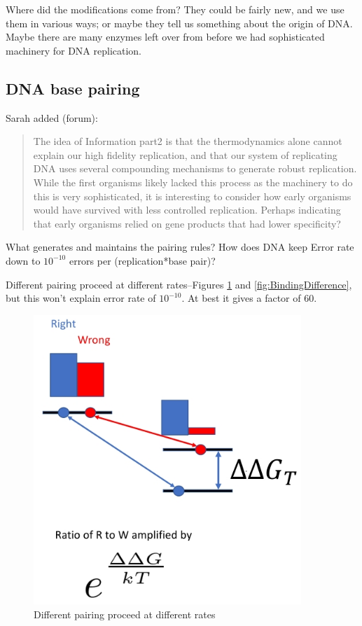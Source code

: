 \documentclass[]{article}
\begin{document}
Where did the modifications come from? They could be fairly new, and we use them in various ways; or maybe they tell us something about the origin of DNA. Maybe there are many enzymes left over from before we had sophisticated machinery for DNA replication.

\subsection{DNA base pairing}\label{section:DNAasInfo2}

Sarah added (forum):\begin{quote}
	The idea of Information part2 is that the thermodynamics alone cannot explain our high fidelity replication, and that our system of replicating DNA uses several compounding mechanisms to generate robust replication. While the first organisms likely lacked this process as the machinery to do this is very sophisticated, it is interesting to consider how early organisms would have survived with less controlled replication. Perhaps indicating that early organisms relied on gene products that had lower specificity?
\end{quote}

What generates and maintains the pairing rules?  How does DNA keep Error rate down to  $10^{-10}$ errors per (replication*base pair)?

Different pairing proceed at different rates--Figures \ref{fig:RightWrong} and \ref{fig:BindingDifference}, but this won't explain error rate of $10^{-10}$. At best it gives a factor of 60.
\begin{figure}[H]
	\caption{Different pairing proceed at different rates} \label{fig:RightWrong} 
	\includegraphics[width=0.9\textwidth]{RightWrong}
\end{figure}
\end{document}
